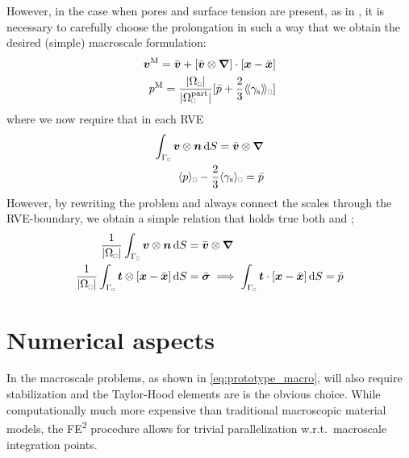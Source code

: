 \documentclass[MikaelDissertation.tex]{subfiles}
\begin{document}
However, in the case when pores and surface tension are present, as in , it is necessary to carefully choose the prolongation in such a way that we obtain the desired (simple) macroscale formulation:
\begin{align}
 \ta v^\macro = \bar{\ta v} + [\bar{\ta v}\outerp\diff]\cdot[\ta x - \bar{\ta x}]
\\
 p^\macro = \frac{\volume}{|\Omega_\rve^\particle|}[\bar{p} + \frac23\shomgen{\gamma_\surf}]
\end{align}
where we now require that in each RVE
\begin{align}
 \int_{\Gamma_\rve}\ta v\outerp\ta n\dif S = \bar{\ta v}\outerp\diff
\\
 \homgen{p} - \frac23\homgen{\gamma_\surf} = \bar{p}
\end{align}
However, by rewriting the problem and always connect the scales through the RVE-boundary, we obtain a simple relation that holds true both  and ;
\begin{align}
 \frac{1}{\volume}\int_{\Gamma_\rve}\ta v\outerp\ta n\dif S &= \bar{\ta v}\outerp\diff
\\
 \frac{1}{\volume}\int_{\Gamma_\rve}\ta t\outerp[\ta x-\bar{\ta x}]\dif S &= \bar{\ts\sigma} \implies \int_{\Gamma_\rve}\ta t\cdot[\ta x-\bar{\ta x}]\dif S = \bar{p}
\end{align}


\section{Numerical aspects}

In  the macroscale problems, as shown in \cref{eq:prototype_macro}, will also require stabilization and the Taylor-Hood elements are is the obvious choice.
While computationally much more expensive than traditional macroscopic material models, the FE\textsuperscript{2} procedure allows for trivial parallelization w.r.t.\ macroscale integration points.




\end{document}
